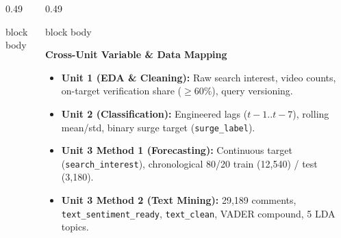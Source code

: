 \documentclass[aspectratio=169, 10pt]{beamer}
\newenvironment{card}[1][]{%
        \begin{beamercolorbox}[rounded=true,shadow=false,wd=\linewidth,sep=3.5pt,#1]{block body}%
        \fontsize{7.8pt}{9.8pt}\selectfont%
    }{%
        \end{beamercolorbox}%
    }
\begin{document}
\begin{frame}[t]
\begin{columns}[T]
\begin{column}{0.49\textwidth}
\begin{card}
                \end{card}                                                                                                                                                                             
            \end{column}                                                                                                                                                                               
                                                                                                                                                                                                       
            \begin{column}{0.49\textwidth}                                                                                                                                                             
                \begin{card}                                                                                                                                                                           
                    \textbf{\color{NavyPrimary}Cross-Unit Variable \& Data Mapping}\\[0.03cm]                                                                                                          
                    \begin{itemize}\setlength{\itemsep}{1.2pt}                                                                                                                                         
                        \item \textbf{Unit 1 (EDA \& Cleaning):} Raw search interest, video counts, on-target verification share ($\ge 60\%$), query versioning.                                       
                        \item \textbf{Unit 2 (Classification):} Engineered lags ($t-1..t-7$), rolling mean/std, binary surge target (\texttt{surge\_label}).                                           
                        \item \textbf{Unit 3 Method 1 (Forecasting):} Continuous target (\texttt{search\_interest}), chronological 80/20 train (12,540) / test (3,180).                                
                        \item \textbf{Unit 3 Method 2 (Text Mining):} 29,189 comments, \texttt{text\_sentiment\_ready}, \texttt{text\_clean}, VADER compound, 5 LDA topics.                            

\end{itemize}
\end{card}
\end{column}
\end{columns}
\end{frame}
\end{document}
